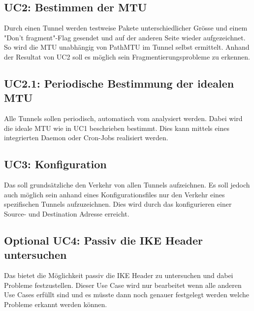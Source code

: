 \subsection{UC2: Bestimmen der MTU}
Durch einen Tunnel werden testweise Pakete unterschiedlicher Grösse und einem "Don't fragment"-Flag gesendet und auf der anderen Seite wieder aufgezeichnet. So wird die MTU unabhängig von PathMTU im Tunnel selbst ermittelt. Anhand der Resultat von UC2 soll es möglich sein Fragmentierungsprobleme zu erkennen.

\subsection{UC2.1: Periodische Bestimmung der idealen MTU}
Alle Tunnels sollen periodisch, automatisch vom \tool analysiert werden. Dabei wird die ideale MTU wie in UC1 beschrieben bestimmt. Dies kann mittels eines integrierten Daemon oder Cron-Jobs realisiert werden.

\subsection{UC3: Konfiguration}
Das \tool soll grundsätzliche den Verkehr von allen Tunnels aufzeichnen. Es soll jedoch auch möglich sein anhand eines Konfigurationsfiles nur den Verkehr eines spezifischen Tunnels aufzuzeichnen. Dies wird durch das konfigurieren einer Source- und Destination Adresse erreicht.

\subsection{Optional UC4: Passiv die IKE Header untersuchen}
Das \tool bietet die Möglichkeit passiv die IKE Header zu untersuchen und dabei Probleme festzustellen. Dieser Use Case wird nur bearbeitet wenn alle anderen Use Cases erfüllt sind und es müsste dann noch genauer festgelegt werden welche Probleme erkannt werden können.